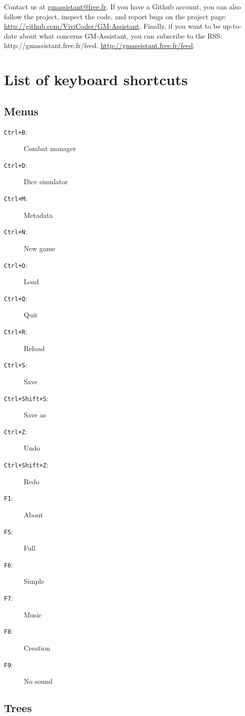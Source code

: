 \documentclass[a4paper,12pt]{article}
\newcommand*{\interfaceitem}[1]{\texttt{#1}}
\begin{document}
Contact us at \url{gmassistant@free.fr}.
If you have a Github account, you can also follow the project, inspect the code, and report bugs on the project page: \url{http://github.com/ViviCoder/GM-Assistant}.
Finally, if you want to be up-to-date about what concerns GM-Assistant, you can subscribe to the RSS: http://gmassistant.free.fr/feed. \url{http://gmassistant.free.fr/feed}.

\appendix

\section{List of keyboard shortcuts}
\label{sec:shortcuts}

\subsection{Menus}

\begin{description}
    \item[\interfaceitem{Ctrl+B}:]{Combat manager}
    \item[\interfaceitem{Ctrl+D}:]{Dice simulator}
    \item[\interfaceitem{Ctrl+M}:]{Metadata}
    \item[\interfaceitem{Ctrl+N}:]{New game}
    \item[\interfaceitem{Ctrl+O}:]{Load}
    \item[\interfaceitem{Ctrl+Q}:]{Quit}
    \item[\interfaceitem{Ctrl+R}:]{Reload}
    \item[\interfaceitem{Ctrl+S}:]{Save}
    \item[\interfaceitem{Ctrl+Shift+S}:]{Save as}
    \item[\interfaceitem{Ctrl+Z}:]{Undo}
    \item[\interfaceitem{Ctrl+Shift+Z}:]{Redo}
    \item[\interfaceitem{F1}:]{About}
    \item[\interfaceitem{F5}:]{Full}
    \item[\interfaceitem{F6}:]{Simple}
    \item[\interfaceitem{F7}:]{Music}
    \item[\interfaceitem{F8}:]{Creation}
    \item[\interfaceitem{F9}:]{No sound}
\end{description}

\subsection{Trees}
\end{document}
